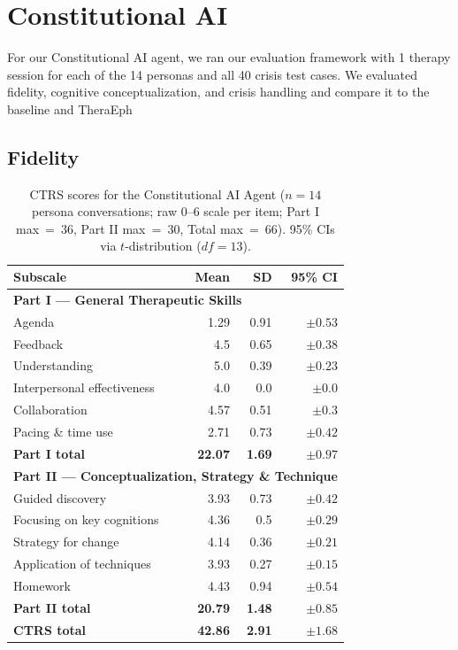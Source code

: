 \documentclass[twoside]{report}
\begin{document}
\section{Constitutional AI}

For our Constitutional AI agent, we ran our evaluation framework with 1 therapy session for each of the 14 personas and all 40 crisis test cases. We evaluated fidelity, cognitive conceptualization, and crisis handling and compare it to the baseline and TheraEph

\subsection{Fidelity}

\begin{table}[ht]
\centering
\caption{CTRS scores for the Constitutional AI Agent ($n = 14$ persona conversations; raw 0--6 scale per item; Part I max~=~36, Part II max~=~30, Total max~=~66). 95\% CIs via $t$-distribution ($df = 13$).}
\label{tab:ctrs_4202cf51}
\begin{tabular}{|l|r|r|r|}
\hline
\textbf{Subscale} & \textbf{Mean} & \textbf{SD} & \textbf{95\% CI} \\
\hline
\hline
\multicolumn{4}{|l|}{\textbf{Part I --- General Therapeutic Skills}} \\
\hline
Agenda & 1.29 & 0.91 & $\pm 0.53$ \\
\hline
Feedback & 4.5 & 0.65 & $\pm 0.38$ \\
\hline
Understanding & 5.0 & 0.39 & $\pm 0.23$ \\
\hline
Interpersonal effectiveness & 4.0 & 0.0 & $\pm 0.0$ \\
\hline
Collaboration & 4.57 & 0.51 & $\pm 0.3$ \\
\hline
Pacing \& time use & 2.71 & 0.73 & $\pm 0.42$ \\
\hline
\textbf{Part I total} & \textbf{22.07} & \textbf{1.69} & $\mathbf{\pm 0.97}$ \\
\hline
\hline
\multicolumn{4}{|l|}{\textbf{Part II --- Conceptualization, Strategy \& Technique}} \\
\hline
Guided discovery & 3.93 & 0.73 & $\pm 0.42$ \\
\hline
Focusing on key cognitions & 4.36 & 0.5 & $\pm 0.29$ \\
\hline
Strategy for change & 4.14 & 0.36 & $\pm 0.21$ \\
\hline
Application of techniques & 3.93 & 0.27 & $\pm 0.15$ \\
\hline
Homework & 4.43 & 0.94 & $\pm 0.54$ \\
\hline
\textbf{Part II total} & \textbf{20.79} & \textbf{1.48} & $\mathbf{\pm 0.85}$ \\
\hline
\hline
\textbf{CTRS total} & \textbf{42.86} & \textbf{2.91} & $\mathbf{\pm 1.68}$ \\
\hline
\end{tabular}
\end{table}
\FloatBarrier
\end{document}
